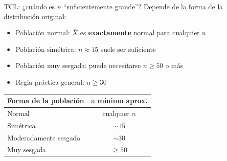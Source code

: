 \documentclass[aspectratio=169, 11pt]{beamer}
\begin{document}
\begin{frame}{TCL: ¿cuándo es $n$ ``suficientemente grande''?}
\alert{Depende de la forma de la distribución original}:
\begin{itemize}
\item Población normal: $\bar{X}$ es \textbf{exactamente} normal para cualquier $n$
\item Población simétrica: $n \approx 15$ suele ser suficiente
\item Población muy sesgada: puede necesitarse $n \geq 50$ o más
\item Regla práctica general: $n \geq 30$
\end{itemize}

\vspace{1em}
\begin{center}
{\small
\begin{tabular}{lc}
\toprule
\textbf{Forma de la población} & \textbf{$n$ mínimo aprox.} \\
\midrule
Normal & cualquier $n$ \\
Simétrica & $\sim 15$ \\
Moderadamente sesgada & $\sim 30$ \\
Muy sesgada & $\geq 50$ \\
\bottomrule
\end{tabular}
}
\end{center}
\end{frame}
\end{document}
